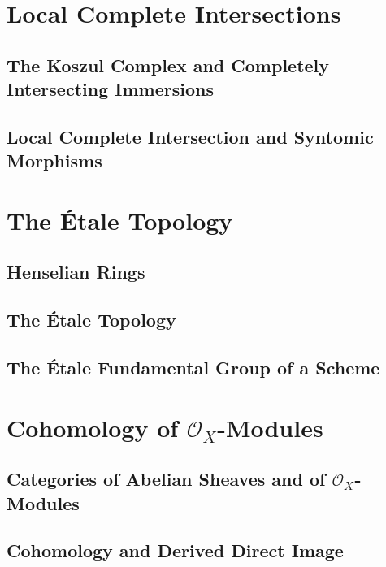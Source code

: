 \documentclass[11pt, a4paper]{article}
\begin{document}
\section{Local Complete Intersections}

\subsection{The Koszul Complex and Completely Intersecting Immersions}

\subsection{Local Complete Intersection and Syntomic Morphisms}

\section{The \'Etale Topology}

\subsection{Henselian Rings}

\subsection{The \'Etale Topology}

\subsection{The \'Etale Fundamental Group of a Scheme}

\section{Cohomology of $\mathcal{O}_X$-Modules}

\subsection{Categories of Abelian Sheaves and of $\mathcal{O}_X$-Modules}

\subsection{Cohomology and Derived Direct Image}
\end{document}
